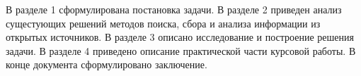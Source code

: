 \par
В разделе 1 сформулирована постановка задачи. 
В разделе 2 приведен анализ сущестующих решений методов поиска, сбора и анализа информации из открытых источников. 
В разделе 3 описано исследование и построение решения задачи. 
В разделе 4 приведено описание практической части курсовой работы. 
В конце документа сформулировано заключение.
